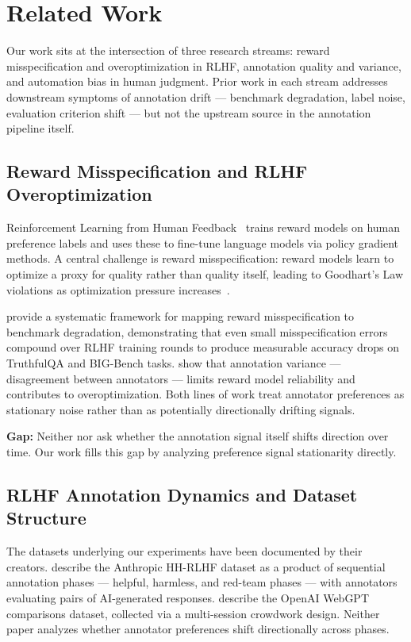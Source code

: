 \section{Related Work}
\label{sec:related}

Our work sits at the intersection of three research streams: reward misspecification and overoptimization in RLHF, annotation quality and variance, and automation bias in human judgment. Prior work in each stream addresses downstream symptoms of annotation drift --- benchmark degradation, label noise, evaluation criterion shift --- but not the upstream source in the annotation pipeline itself.

\subsection{Reward Misspecification and RLHF Overoptimization}

Reinforcement Learning from Human Feedback~\citep{Christiano2017Deep,Ouyang2022Training} trains reward models on human preference labels and uses these to fine-tune language models via policy gradient methods. A central challenge is reward misspecification: reward models learn to optimize a proxy for quality rather than quality itself, leading to Goodhart's Law violations as optimization pressure increases~\citep{Gao2022Scaling}.

\citet{Pan2022Effects} provide a systematic framework for mapping reward misspecification to benchmark degradation, demonstrating that even small misspecification errors compound over RLHF training rounds to produce measurable accuracy drops on TruthfulQA and BIG-Bench tasks. \citet{Coste2023Reward} show that annotation variance --- disagreement between annotators --- limits reward model reliability and contributes to overoptimization. Both lines of work treat annotator preferences as stationary noise rather than as potentially directionally drifting signals.

\textbf{Gap:} Neither \citet{Pan2022Effects} nor \citet{Coste2023Reward} ask whether the annotation signal itself shifts direction over time. Our work fills this gap by analyzing preference signal stationarity directly.

\subsection{RLHF Annotation Dynamics and Dataset Structure}

The datasets underlying our experiments have been documented by their creators. \citet{Bai2022Training} describe the Anthropic HH-RLHF dataset as a product of sequential annotation phases --- helpful, harmless, and red-team phases --- with annotators evaluating pairs of AI-generated responses. \citet{Stiennon2020Learning} describe the OpenAI WebGPT comparisons dataset, collected via a multi-session crowdwork design. Neither paper analyzes whether annotator preferences shift directionally across phases.

